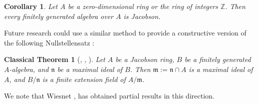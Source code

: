 \documentclass[11pt]{article}
\newtheorem*{classicaltheorem}{Classical Theorem}
\newtheorem{corollary}{Corollary}[section]
\theoremstyle{definition}
\newcommand\Z{\mathbb{Z}}
\begin{document}
\begin{corollary}
    Let $A$ be a zero-dimensional ring or the ring of integers $\Z$.
    Then every finitely generated algebra over $A$ is Jacobson.
\end{corollary}
Future research could use a similar method to provide a constructive version of the following Nullstellensatz \cite[{}1.4]{Lom23}:
\begin{classicaltheorem}[{\cite[Theorem 5 and its corollary]{Gol51}, \cite[Satz 1]{Kru51}, \cite[Theorem 4.19]{Eis95}}]
    Let $A$ be a Jacobson ring, $B$ be a finitely generated $A$-algebra, and $\mathfrak{n}$ be a maximal ideal of $B$. Then $\mathfrak{m}:=\mathfrak{n}\cap A$ is a maximal ideal of $A$, and $B/\mathfrak{n}$ is a finite extension field of $A/\mathfrak{m}$.
\end{classicaltheorem}
We note that Wiesnet \cite[Theorem 1]{Wie21}, \cite[Theorem 2]{Wie25} has obtained partial results in this direction.
\end{document}
